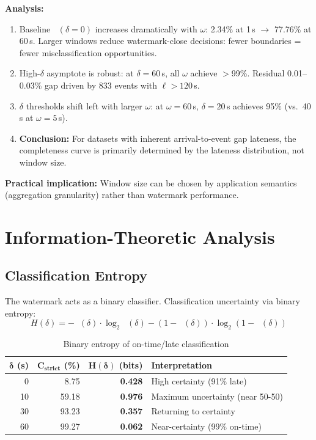 \documentclass[11pt,a4paper]{article}
\DeclareMathOperator{\Cstrict}{C_{\text{strict}}}
\newcommand{\lateness}{\ell}
\begin{document}
\textbf{Analysis:}
\begin{enumerate}[leftmargin=*, itemsep=2pt]
  \item Baseline $\Cstrict(\delta{=}0)$ increases dramatically with $\omega$: 2.34\% at 1\,s $\to$ 77.76\% at 60\,s. Larger windows reduce watermark-close decisions: fewer boundaries = fewer misclassification opportunities.
  \item High-$\delta$ asymptote is robust: at $\delta=60$\,s, all $\omega$ achieve $>$99\%. Residual 0.01--0.03\% gap driven by 833 events with $\lateness > 120$\,s.
  \item $\delta$ thresholds shift left with larger $\omega$: at $\omega{=}60$\,s, $\delta{=}20$\,s achieves 95\% (vs.\ 40\,s at $\omega{=}5$\,s).
  \item \textbf{Conclusion:} For datasets with inherent arrival-to-event gap lateness, the completeness curve is primarily determined by the lateness distribution, not window size.
\end{enumerate}

\textbf{Practical implication:} Window size can be chosen by application semantics (aggregation granularity) rather than watermark performance.

\section{Information-Theoretic Analysis}

\subsection{Classification Entropy}

The watermark acts as a binary classifier. Classification uncertainty via binary entropy:
\begin{equation}
  H(\delta) = -\Cstrict(\delta) \cdot \log_2 \Cstrict(\delta) - (1 - \Cstrict(\delta)) \cdot \log_2(1 - \Cstrict(\delta))
\end{equation}

\begin{table}[H]
\centering
\caption{Binary entropy of on-time/late classification}
\label{tab:entropy}
\begin{tabular}{rrrl}
\toprule
$\bm{\delta}$ \textbf{(s)} & $\mathbf{C_{\textbf{strict}}}$ \textbf{(\%)} & $\mathbf{H(\delta)}$ \textbf{(bits)} & \textbf{Interpretation} \\
\midrule
0  & 8.75  & \textbf{0.428} & High certainty (91\% late) \\
10 & 59.18 & \textbf{0.976} & Maximum uncertainty (near 50-50) \\
30 & 93.23 & \textbf{0.357} & Returning to certainty \\
60 & 99.27 & \textbf{0.062} & Near-certainty (99\% on-time) \\
\bottomrule
\end{tabular}
\end{table}
\end{document}
